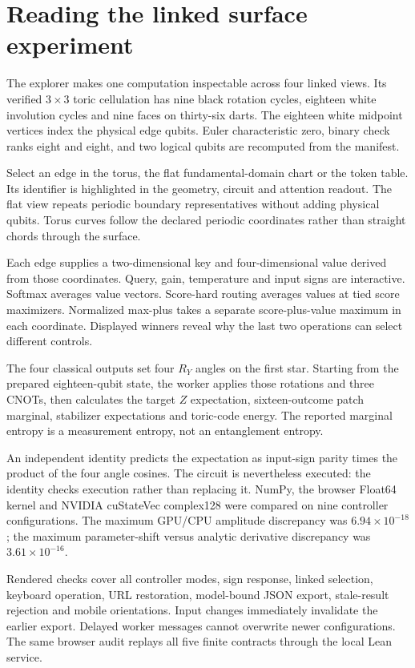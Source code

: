 \chapter{Reading the linked surface experiment}

The explorer makes one computation inspectable across four linked views. Its verified $3\times3$ toric cellulation has nine black rotation cycles, eighteen white involution cycles and nine faces on thirty-six darts. The eighteen white midpoint vertices index the physical edge qubits. Euler characteristic zero, binary check ranks eight and eight, and two logical qubits are recomputed from the manifest.

Select an edge in the torus, the flat fundamental-domain chart or the token table. Its identifier is highlighted in the geometry, circuit and attention readout. The flat view repeats periodic boundary representatives without adding physical qubits. Torus curves follow the declared periodic coordinates rather than straight chords through the surface.

Each edge supplies a two-dimensional key and four-dimensional value derived from those coordinates. Query, gain, temperature and input signs are interactive. Softmax averages value vectors. Score-hard routing averages values at tied score maximizers. Normalized max-plus takes a separate score-plus-value maximum in each coordinate. Displayed winners reveal why the last two operations can select different controls.

The four classical outputs set four $R_Y$ angles on the first star. Starting from the prepared eighteen-qubit state, the worker applies those rotations and three CNOTs, then calculates the target $Z$ expectation, sixteen-outcome patch marginal, stabilizer expectations and toric-code energy. The reported marginal entropy is a measurement entropy, not an entanglement entropy.

An independent identity predicts the expectation as input-sign parity times the product of the four angle cosines. The circuit is nevertheless executed: the identity checks execution rather than replacing it. NumPy, the browser Float64 kernel and NVIDIA cuStateVec complex128 were compared on nine controller configurations. The maximum GPU/CPU amplitude discrepancy was $6.94\times10^{-18}$; the maximum parameter-shift versus analytic derivative discrepancy was $3.61\times10^{-16}$.

Rendered checks cover all controller modes, sign response, linked selection, keyboard operation, URL restoration, model-bound JSON export, stale-result rejection and mobile orientations. Input changes immediately invalidate the earlier export. Delayed worker messages cannot overwrite newer configurations. The same browser audit replays all five finite contracts through the local Lean service.

